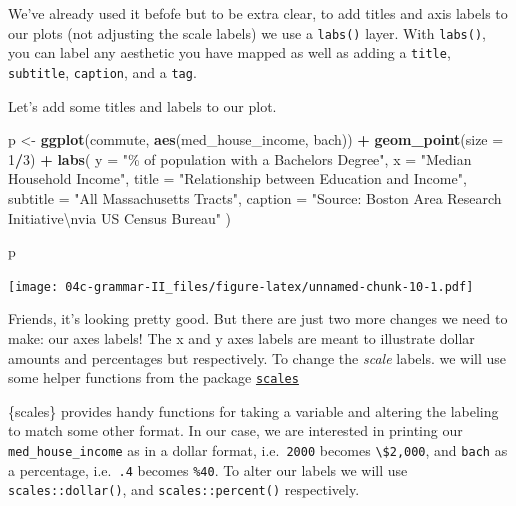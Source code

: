 \documentclass[
]{book}
\newenvironment{Shaded}{\begin{snugshade}}{\end{snugshade}}
\newcommand{\CharTok}[1]{\textcolor[rgb]{0.31,0.60,0.02}{#1}}
\newcommand{\DataTypeTok}[1]{\textcolor[rgb]{0.13,0.29,0.53}{#1}}
\newcommand{\DecValTok}[1]{\textcolor[rgb]{0.00,0.00,0.81}{#1}}
\newcommand{\KeywordTok}[1]{\textcolor[rgb]{0.13,0.29,0.53}{\textbf{#1}}}
\newcommand{\NormalTok}[1]{#1}
\newcommand{\OperatorTok}[1]{\textcolor[rgb]{0.81,0.36,0.00}{\textbf{#1}}}
\newcommand{\StringTok}[1]{\textcolor[rgb]{0.31,0.60,0.02}{#1}}
\begin{document}
We've already used it befofe but to be extra clear, to add titles and axis labels to our plots (not adjusting the scale labels) we use a \texttt{labs()} layer. With \texttt{labs()}, you can label any aesthetic you have mapped as well as adding a \texttt{title}, \texttt{subtitle}, \texttt{caption}, and a \texttt{tag}.

Let's add some titles and labels to our plot.

\begin{Shaded}
\begin{Highlighting}[]
\NormalTok{p \textless{}{-}}\StringTok{ }\KeywordTok{ggplot}\NormalTok{(commute, }\KeywordTok{aes}\NormalTok{(med\_house\_income, bach)) }\OperatorTok{+}
\StringTok{  }\KeywordTok{geom\_point}\NormalTok{(}\DataTypeTok{size =} \DecValTok{1}\OperatorTok{/}\DecValTok{3}\NormalTok{) }\OperatorTok{+}
\StringTok{    }\KeywordTok{labs}\NormalTok{(}
       \DataTypeTok{y =} \StringTok{"\% of population with a Bachelor\textquotesingle{}s Degree"}\NormalTok{,}
       \DataTypeTok{x =} \StringTok{"Median Household Income"}\NormalTok{,}
       \DataTypeTok{title =} \StringTok{"Relationship between Education and Income"}\NormalTok{,}
       \DataTypeTok{subtitle =} \StringTok{"All Massachusetts Tracts"}\NormalTok{,}
       \DataTypeTok{caption =} \StringTok{"Source: Boston Area Research Initiative}\CharTok{\textbackslash{}n}\StringTok{via US Census Bureau"}
\NormalTok{      )}

\NormalTok{p}
\end{Highlighting}
\end{Shaded}

\texttt{[image: 04c-grammar-II\_files/figure-latex/unnamed-chunk-10-1.pdf]}

Friends, it's looking pretty good. But there are just two more changes we need to make: our axes labels! The x and y axes labels are meant to illustrate dollar amounts and percentages but respectively. To change the \emph{scale} labels. we will use some helper functions from the package \href{https://scales.r-lib.org/}{\texttt{scales}}

\{scales\} provides handy functions for taking a variable and altering the labeling to match some other format. In our case, we are interested in printing our \texttt{med\_house\_income} as in a dollar format, i.e.~\texttt{2000} becomes \texttt{\textbackslash{}\$2,000}, and \texttt{bach} as a percentage, i.e.~\texttt{.4} becomes \texttt{\%40}. To alter our labels we will use \texttt{scales::dollar()}, and \texttt{scales::percent()} respectively.
\end{document}
